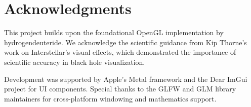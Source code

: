 \documentclass[12pt,a4paper]{article}
\theoremstyle{definition}
\theoremstyle{remark}
\begin{document}
\section*{Acknowledgments}

This project builds upon the foundational OpenGL implementation by hydrogendeuteride. We acknowledge the scientific guidance from Kip Thorne's work on Interstellar's visual effects, which demonstrated the importance of scientific accuracy in black hole visualization.

Development was supported by Apple's Metal framework and the Dear ImGui project for UI components. Special thanks to the GLFW and GLM library maintainers for cross-platform windowing and mathematics support.
\end{document}

